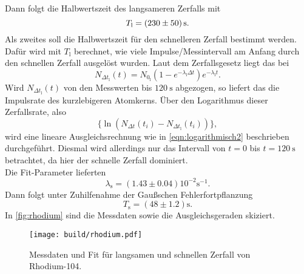 \noindent Dann folgt die Halbwertszeit des langsameren Zerfalls mit
\begin{equation}
	T_\text{l} = \SI{230\pm50}{\second}.
\end{equation}
\noindent
Als zweites soll die Halbwertszeit für den schnelleren Zerfall bestimmt werden. Dafür wird mit
$T_\text{l}$ berechnet, wie viele Impulse/Messintervall am Anfang durch den schnellen Zerfall ausgelöst wurden.
Laut dem Zerfallsgesetz liegt das bei
\begin{equation}
	N_{\Delta t_\text{l}} (t) = N_{0_\text{l}} \left(1 - e^{-\lambda_\text{l}\Delta t}\right) 
	e^{-\lambda_\text{l}t }.
\end{equation}
\noindent
Wird $N_{\Delta t_\text{l}}(t)$ von den Messwerten bis $\SI{120}{\second}$ abgezogen, so liefert das
die Impulsrate des kurzlebigeren Atomkerns. Über den Logarithmus dieser Zerfallsrate, also
\begin{equation}
	\{ \ln(N_{\Delta t}(t_i) - N_{\Delta t_\text{l}} (t_i)) \},
\end{equation}
wird eine lineare Ausgleichsrechnung wie in \autoref{eqn:logarithmisch2} beschrieben durchgeführt. Diesmal
wird allerdings nur das Intervall von $t=0$ bis $t=\SI{120}{\second}$ betrachtet, da hier der schnelle 
Zerfall dominiert.
\\
Die Fit-Parameter lieferten
\begin{equation}
	\lambda_\text{s} = (1.43 \pm 0.04) 10^{-2} \si{\second}^{-1}.
\end{equation}
Dann folgt unter Zuhilfenahme der Gaußschen Fehlerfortpflanzung
\begin{equation}
	T_\text{s} = (48\pm1.2)\si{\second}.
\end{equation}
\noindent
In \autoref{fig:rhodium} sind die Messdaten sowie die Ausgleichsgeraden skiziert.
\begin{figure}[H]
	\centering
	\texttt{[image: build/rhodium.pdf]}
	\caption{Messdaten und Fit für langsamen und schnellen Zerfall von Rhodium-104.}
	\label{fig:rhodium}
\end{figure}
